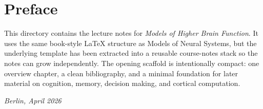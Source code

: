 \chapter*{Preface}

This directory contains the lecture notes for \emph{Models of Higher Brain Function}. It uses the same book-style LaTeX structure as Models of Neural Systems, but the underlying template has been extracted into a reusable course-notes stack so the notes can grow independently.
The opening scaffold is intentionally compact: one overview chapter, a clean bibliography, and a minimal foundation for later material on cognition, memory, decision making, and cortical computation.

\bigskip
\noindent\textit{Berlin, April 2026}
